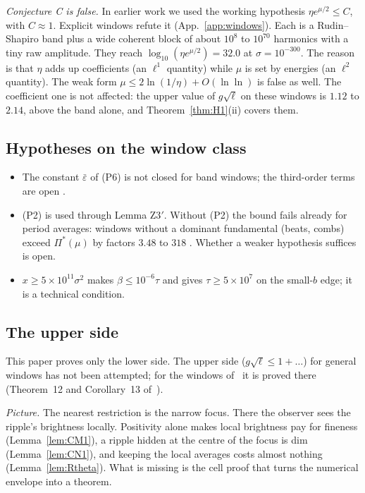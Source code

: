 \emph{Conjecture C is false.}
In earlier work we used the working hypothesis $\eta e^{\mu/2}\le C$, with $C\approx1$.
Explicit windows refute it (App.~\ref{app:windows}).
Each is a Rudin--Shapiro band plus a wide coherent block of about $10^8$ to $10^{70}$ harmonics with a tiny raw amplitude.
They reach $\log_{10}(\eta e^{\mu/2})=32.0$ at $\sigma=10^{-300}$.
The reason is that $\eta$ adds up coefficients (an $\ell^1$ quantity) while $\mu$ is set by energies (an $\ell^2$ quantity).
The weak form $\mu\le2\ln(1/\eta)+O(\ln\ln)$ is false as well.
The coefficient one is not affected: the upper value of $g\sqrt\ell$ on these windows is $1.12$ to $2.14$, above the band alone, and Theorem~\ref{thm:H1}(ii) covers them.

\subsection{Hypotheses on the window class}
\label{sec:open:class}
\begin{itemize}
\item The constant $\bar\varepsilon$ of (P6) is not closed for band windows; the third-order terms are open \conjst.
\item (P2) is used through Lemma Z3$'$. Without (P2) the bound fails already for period averages: windows without a dominant fundamental (beats, combs) exceed $\Pi^*(\mu)$ by factors $3.48$ to $318$ \numst. Whether a weaker hypothesis suffices is open.
\item $x\ge5\times10^{11}\sigma^2$ makes $\beta\le10^{-6}\tau$ and gives $\tau\ge5\times10^7$ on the small-$b$ edge; it is a technical condition.
\end{itemize}

\subsection{The upper side}
\label{sec:open:upper}
This paper proves only the lower side.
The upper side ($g\sqrt\ell\le1+\dots$) for general windows has not been attempted; for the windows of~\cite{F} it is proved there (Theorem~12 and Corollary~13 of~\cite{F}).

\emph{Picture.} The nearest restriction is the narrow focus.
There the observer sees the ripple's brightness locally.
Positivity alone makes local brightness pay for fineness (Lemma~\ref{lem:CM1}), a ripple hidden at the centre of the focus is dim (Lemma~\ref{lem:CN1}), and keeping the local averages costs almost nothing (Lemma~\ref{lem:Rtheta}).
What is missing is the cell proof that turns the numerical envelope into a theorem.
